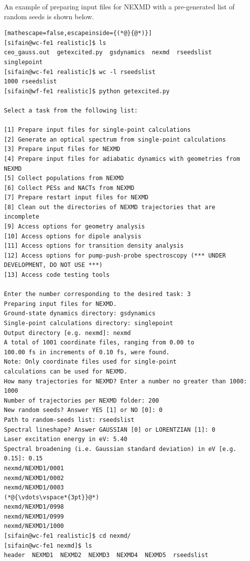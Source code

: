 \documentclass[letterpaper,12pt,titlepage]{article}
\begin{document}
An example of preparing input files for NEXMD with a pre-generated list of random seeds is shown below.
\begin{lstlisting}[mathescape=false,escapeinside={(*@}{@*)}]
[sifain@wc-fe1 realistic]$ ls
ceo_gauss.out  getexcited.py  gsdynamics  nexmd  rseedslist  singlepoint
[sifain@wc-fe1 realistic]$ wc -l rseedslist 
1000 rseedslist
[sifain@wf-fe1 realistic]$ python getexcited.py 

Select a task from the following list:

[1] Prepare input files for single-point calculations
[2] Generate an optical spectrum from single-point calculations
[3] Prepare input files for NEXMD
[4] Prepare input files for adiabatic dynamics with geometries from NEXMD
[5] Collect populations from NEXMD
[6] Collect PESs and NACTs from NEXMD
[7] Prepare restart input files for NEXMD
[8] Clean out the directories of NEXMD trajectories that are incomplete
[9] Access options for geometry analysis
[10] Access options for dipole analysis
[11] Access options for transition density analysis
[12] Access options for pump-push-probe spectroscopy (*** UNDER DEVELOPMENT, DO NOT USE ***)
[13] Access code testing tools

Enter the number corresponding to the desired task: 3
Preparing input files for NEXMD.
Ground-state dynamics directory: gsdynamics
Single-point calculations directory: singlepoint
Output directory [e.g. nexmd]: nexmd 
A total of 1001 coordinate files, ranging from 0.00 to 
100.00 fs in increments of 0.10 fs, were found.
Note: Only coordinate files used for single-point 
calculations can be used for NEXMD.
How many trajectories for NEXMD? Enter a number no greater than 1000: 1000
Number of trajectories per NEXMD folder: 200
New random seeds? Answer YES [1] or NO [0]: 0
Path to random-seeds list: rseedslist
Spectral lineshape? Answer GAUSSIAN [0] or LORENTZIAN [1]: 0
Laser excitation energy in eV: 5.40
Spectral broadening (i.e. Gaussian standard deviation) in eV [e.g. 0.15]: 0.15
nexmd/NEXMD1/0001
nexmd/NEXMD1/0002
nexmd/NEXMD1/0003
(*@{\vdots\vspace*{3pt}}@*)
nexmd/NEXMD1/0998
nexmd/NEXMD1/0999
nexmd/NEXMD1/1000
[sifain@wc-fe1 realistic]$ cd nexmd/
[sifain@wc-fe1 nexmd]$ ls
header  NEXMD1  NEXMD2  NEXMD3  NEXMD4  NEXMD5  rseedslist
\end{lstlisting}
\end{document}
